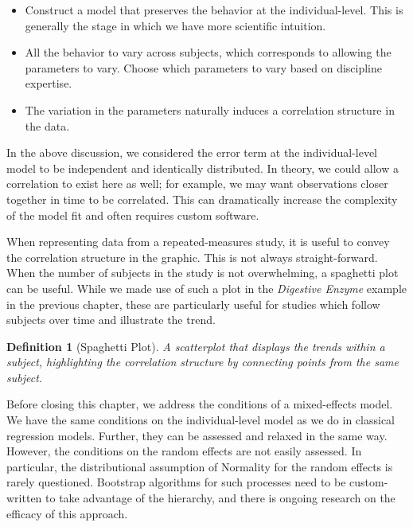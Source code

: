 \documentclass[
]{book}
\providecommand{\tightlist}{%
  \setlength{\itemsep}{0pt}\setlength{\parskip}{0pt}}
\theoremstyle{plain}
\theoremstyle{mydefn}
\newtheorem{definition}{Definition}[chapter]
\theoremstyle{myexmpl}
\theoremstyle{remark}
\begin{document}
\begin{itemize}
\tightlist
\item
  Construct a model that preserves the behavior at the individual-level. This is generally the stage in which we have more scientific intuition.
\item
  All the behavior to vary across subjects, which corresponds to allowing the parameters to vary. Choose which parameters to vary based on discipline expertise.
\item
  The variation in the parameters naturally induces a correlation structure in the data.
\end{itemize}

In the above discussion, we considered the error term at the individual-level model to be independent and identically distributed. In theory, we could allow a correlation to exist here as well; for example, we may want observations closer together in time to be correlated. This can dramatically increase the complexity of the model fit and often requires custom software.

When representing data from a repeated-measures study, it is useful to convey the correlation structure in the graphic. This is not always straight-forward. When the number of subjects in the study is not overwhelming, a spaghetti plot can be useful. While we made use of such a plot in the \emph{Digestive Enzyme} example in the previous chapter, these are particularly useful for studies which follow subjects over time and illustrate the trend.

\begin{definition}[Spaghetti Plot]
\protect\hypertarget{def:defn-spaghetti-plot}{}{\label{def:defn-spaghetti-plot} {} }A scatterplot that displays the trends within a subject, highlighting the correlation structure by connecting points from the same subject.
\end{definition}

Before closing this chapter, we address the conditions of a mixed-effects model. We have the same conditions on the individual-level model as we do in classical regression models. Further, they can be assessed and relaxed in the same way. However, the conditions on the random effects are not easily assessed. In particular, the distributional assumption of Normality for the random effects is rarely questioned. Bootstrap algorithms for such processes need to be custom-written to take advantage of the hierarchy, and there is ongoing research on the efficacy of this approach.
\end{document}
